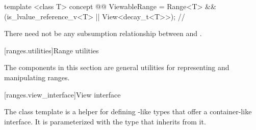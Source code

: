 \begin{codeblock}
template <class T>
concept @@ ViewableRange =
  Range<T> && (is_lvalue_reference_v<T> || View<decay_t<T>>); // \seebelow
\end{codeblock}

\pnum
There need not be any subsumption relationship between 
and .


[ranges.utilities]{Range utilities}

\pnum
The components in this section are general utilities for representing and manipulating
ranges.

[ranges.view_interface]{View interface}

\pnum
The class template  is a helper for defining -like types that offer a
container-like interface. It is parameterized with the type that inherits from it.


